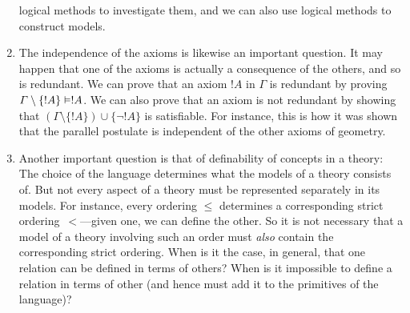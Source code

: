 \documentclass[../../../include/open-logic-section]{subfiles}
\begin{document}
\begin{explain}
\begin{enumerate}
  logical methods to investigate them, and we can also use logical
  methods to construct models.
\item The independence of the axioms is likewise an important
  question.  It may happen that one of the axioms is actually a
  consequence of the others, and so is redundant.  We can prove that
  an axiom $!A$ in $\Gamma$ is redundant by proving $\Gamma \setminus
  \{!A\} \Entails !A$.  We can also prove that an axiom is not
  redundant by showing that $(\Gamma \setminus \{!A\}) \cup \{\lnot
  !A\}$ is satisfiable.  For instance, this is how it was shown that the
  parallel postulate is independent of the other axioms of geometry.
\item Another important question is that of definability of concepts
  in a theory: The choice of the language determines what the models
  of a theory consists of.  But not every aspect of a theory must be
  represented separately in its models.  For instance, every ordering
  $\le$ determines a corresponding strict ordering~$<$---given one, we
  can define the other.  So it is not necessary that a model of a
  theory involving such an order must \emph{also} contain the
  corresponding strict ordering.  When is it the case, in general,
  that one relation can be defined in terms of others?  When is it
  impossible to define a relation in terms of other (and hence must
  add it to the primitives of the language)?
\end{enumerate}
\end{explain}
\end{document}
